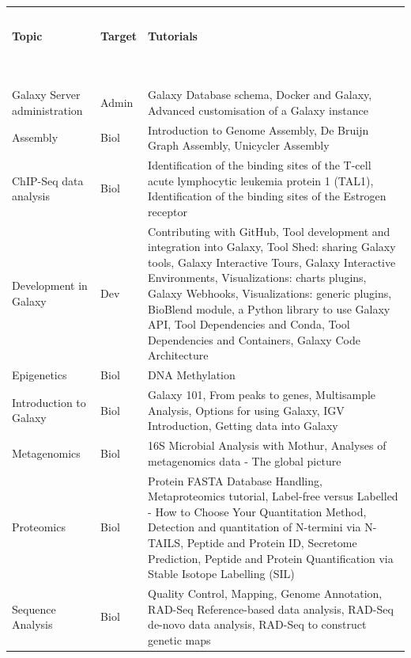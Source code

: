 \begin{table}{}
    \begin{tabular}{llp{8cm}}
    \hline
    \ \\
    \textbf{Topic} & \textbf{Target} & \textbf{Tutorials} \\
    \ \\
    \hline
    \ \\
    Galaxy Server administration &  Admin & Galaxy Database schema, Docker and Galaxy, Advanced customisation of a Galaxy instance \\

    Assembly &  Biol & Introduction to Genome Assembly, De Bruijn Graph Assembly, Unicycler Assembly \\

    ChIP-Seq data analysis & Biol &  Identification of the binding sites of the T-cell acute lymphocytic leukemia protein 1 (TAL1), Identification of the binding sites of the Estrogen receptor \\

    Development in Galaxy &  Dev & Contributing with GitHub, Tool development and integration into Galaxy, Tool Shed: sharing Galaxy tools, Galaxy Interactive Tours, Galaxy Interactive Environments, Visualizations: charts plugins, Galaxy Webhooks, Visualizations: generic plugins, BioBlend module, a Python library to use Galaxy API, Tool Dependencies and Conda, Tool Dependencies and Containers, Galaxy Code Architecture \\

    Epigenetics & Biol & DNA Methylation \\

    Introduction to Galaxy & Biol & Galaxy 101, From peaks to genes, Multisample Analysis, Options for using Galaxy, IGV Introduction, Getting data into Galaxy \\

    Metagenomics & Biol & 16S Microbial Analysis with Mothur, Analyses of metagenomics data - The global picture \\

    Proteomics & Biol & Protein FASTA Database Handling, Metaproteomics tutorial, Label-free versus Labelled - How to Choose Your Quantitation Method, Detection and quantitation of N-termini via N-TAILS, Peptide and Protein ID, Secretome Prediction, Peptide and Protein Quantification via Stable Isotope Labelling (SIL) \\

    Sequence Analysis & Biol & Quality Control, Mapping, Genome Annotation, RAD-Seq Reference-based data analysis, RAD-Seq de-novo data analysis, RAD-Seq to construct genetic maps \\


\end{tabular}
\end{table}
